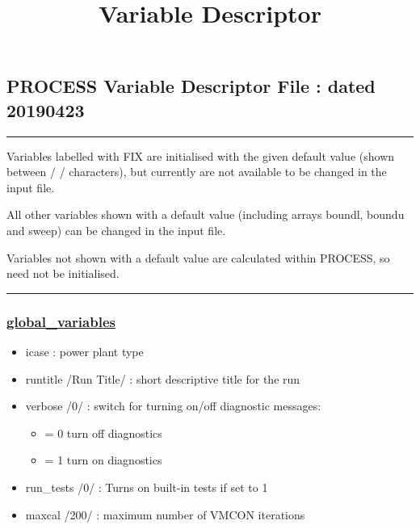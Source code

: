 \documentclass[
]{article}
\title{Variable Descriptor}
\date{}
\providecommand{\tightlist}{%
  \setlength{\itemsep}{0pt}\setlength{\parskip}{0pt}}
\begin{document}
\maketitle

\hypertarget{process-variable-descriptor-file-dated-20190423}{%
\subsection{PROCESS Variable Descriptor File : dated
20190423}\label{process-variable-descriptor-file-dated-20190423}}

\begin{center}\rule{0.5\linewidth}{\linethickness}\end{center}

Variables labelled with FIX are initialised with the given default value
(shown between / / characters), but currently are not available to be
changed in the input file.

All other variables shown with a default value (including arrays boundl,
boundu and sweep) can be changed in the input file.

Variables not shown with a default value are calculated within PROCESS,
so need not be initialised.

\begin{center}\rule{0.5\linewidth}{\linethickness}\end{center}

\hypertarget{global_variables}{%
\subsubsection{\texorpdfstring{\href{global_variables.html}{global\_variables}}{global\_variables}}\label{global_variables}}

\begin{itemize}
\tightlist
\item
  icase : power plant type
\item
  runtitle /Run Title/ : short descriptive title for the run
\item
  verbose /0/ : switch for turning on/off diagnostic messages:

  \begin{itemize}
  \tightlist
  \item
    = 0 turn off diagnostics
  \item
    = 1 turn on diagnostics
  \end{itemize}
\item
  run\_tests /0/ : Turns on built-in tests if set to 1
\item
  maxcal /200/ : maximum number of VMCON iterations
\end{itemize}
\end{document}
